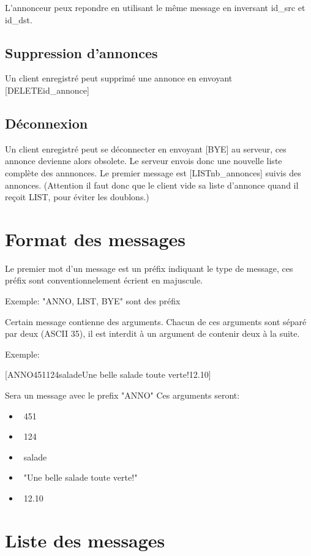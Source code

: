 \documentclass[12pt]{article}
\begin{document}
L'annonceur peux repondre en utilisant le même message en inversant id\_src et id\_dst.



\subsection{Suppression d'annonces}

Un client enregistré peut supprimé une annonce en envoyant [DELETE\separator{}id\_annonce]


\subsection{Déconnexion}

Un client enregistré peut se déconnecter en envoyant [BYE] au serveur, ces annonce devienne alors obsolete.
Le serveur envois donc une nouvelle liste complète des annnonces. Le premier message est [LIST\separator{}nb\_annonces] suivis des annonces. (Attention il faut donc que le client vide sa liste d'annonce quand il reçoit LIST, pour éviter les doublons.)

\section{Format des messages}

Le premier mot d'un message est un préfix indiquant le type de message, ces préfix sont conventionnelement écrient en majuscule.

Exemple: "ANNO, LIST, BYE" sont des préfix

Certain message contienne des arguments. Chacun de ces arguments sont séparé par deux \separator{} (ASCII 35),
il est interdit à un argument de contenir deux \separator{} à la suite.

Exemple:

[ANNO\separator{}451\separator{}124\separator{}salade\separator{}Une belle salade toute verte!\separator{}12.10]

Sera un message avec le prefix "ANNO"
Ces arguments seront:
\begin{itemize}
  \item~451
  \item~124
  \item~salade
  \item~"Une belle salade toute verte!"
  \item~12.10
\end{itemize}

\section{Liste des messages}
\end{document}
